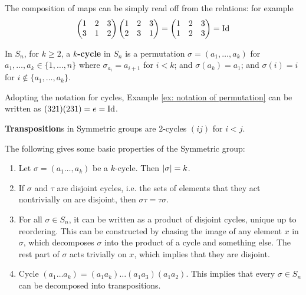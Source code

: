 \documentclass{article}
\begin{document}
\begin{example}\label{ex: notation of permutation}
    The composition of maps can be simply read off from the relations: for example
    \[
        \begin{pmatrix}
            1 & 2 & 3 \\
            3 & 1 & 2 \\
        \end{pmatrix}
        \begin{pmatrix}
            1 & 2 & 3 \\
            2 & 3 & 1 \\
        \end{pmatrix} = 
        \begin{pmatrix}
            1 & 2 & 3 \\
            1 & 2 & 3 \\
        \end{pmatrix} = \mathrm{Id}
    \]
\end{example}

\begin{definition}[Cycle]
    In $S_n$, for $k \geq 2$, a \textbf{$k$-cycle} in $S_n$ is a permutation $\sigma = (a_1, \dots, a_k)$ for $a_1, \dots, a_k \in \{1, \dots, n\}$ where $\sigma_{a_i} = a_{i+1}$ for $i < k$; and $\sigma(a_k) = a_1$; and $\sigma(i) = i$ for $i \notin \{a_1, \dots, a_k\}$.
\end{definition}

\begin{example}\label{ex: notation of permutation using cycles}
    Adopting the notation for cycles, Example \ref{ex: notation of permutation} can be written as $(3 2 1)(2 3 1) = e = \mathrm{Id}$.
\end{example}

\begin{definition}[Transposition]
    \textbf{Transposition}s in Symmetric groups are 2-cycles $(i j)$ for $i < j$.
\end{definition}

\begin{remark}\label{rmk: basic properties of symmetric group}
    The following gives some basic properties of the Symmetric group:
    \begin{enumerate}
        \item Let $\sigma = (a_1 \dots, a_k)$ be a $k$-cycle. Then $\left|\sigma\right| = k$.
        \item If $\sigma$ and $\tau$ are disjoint cycles, i.e. the sets of elements that they act nontrivially on are disjoint, then $\sigma\tau = \tau\sigma$.
        \item For all $\sigma \in S_n$, it can be written as a product of disjoint cycles, unique up to reordering. This can be constructed by chasing the image of any element $x$ in $\sigma$, which decomposes $\sigma$ into the product of a cycle and something else. The rest part of $\sigma$ acts trivially on $x$, which implies that they are disjoint.
        \item Cycle $(a_1 \dots a_k) = (a_1 a_k)\dots (a_1 a_3) (a_1 a_2)$. This implies that every $\sigma \in S_n$ can be decomposed into transpositions.
    \end{enumerate}
\end{remark}
\end{document}
